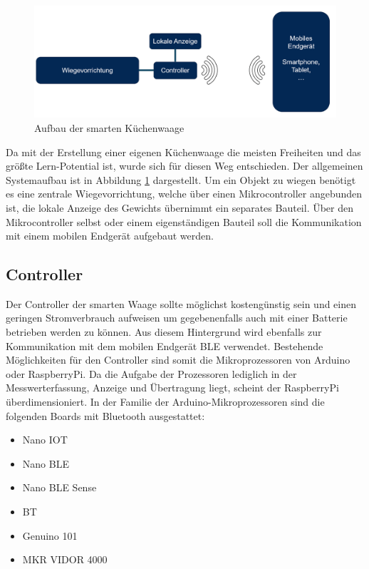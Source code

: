 \begin{figure}[hbtp]
	\centering
	\includegraphics[width=1\textwidth]{Bilder/HW-Aufbau.png}
	\caption{Aufbau der smarten Küchenwaage}
	\label{fig.:HW-Aufbau}
\end{figure}
Da mit der Erstellung einer eigenen Küchenwaage die meisten Freiheiten und das größte Lern-Potential ist, wurde sich für diesen Weg entschieden. Der allgemeinen Systemaufbau ist in Abbildung \ref{fig.:HW-Aufbau} dargestellt. Um ein Objekt zu wiegen benötigt es eine zentrale Wiegevorrichtung, welche über einen Mikrocontroller angebunden ist, die lokale Anzeige des Gewichts übernimmt ein separates Bauteil. Über den Mikrocontroller selbst oder einem eigenständigen Bauteil soll die Kommunikation  mit einem mobilen Endgerät aufgebaut werden. 


\subsection{Controller}

Der Controller der smarten Waage sollte möglichst kostengünstig sein und einen geringen Stromverbrauch aufweisen um gegebenenfalls auch mit einer Batterie betrieben werden zu können. Aus diesem Hintergrund wird ebenfalls zur Kommunikation mit dem mobilen Endgerät \ac{BLE} verwendet. Bestehende Möglichkeiten für den Controller sind somit die Mikroprozessoren von Arduino oder RaspberryPi.
Da die Aufgabe der Prozessoren lediglich in der Messwerterfassung, Anzeige und Übertragung liegt, scheint der RaspberryPi überdimensioniert. In der Familie der Arduino-Mikroprozessoren sind die folgenden Boards mit Bluetooth ausgestattet: 
\begin{itemize}
	\item Nano IOT
	\item Nano BLE
	\item Nano BLE Sense
	\item BT
	\item Genuino 101
	\item MKR VIDOR 4000
\end{itemize}


